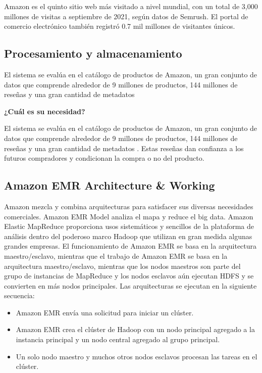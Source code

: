 Amazon es el quinto sitio web más visitado a nivel mundial, con un total de 3,000 millones de visitas a septiembre de 2021, según datos de Semrush. El portal de comercio electrónico también registró 0.7 mil millones de visitantes únicos. 

\subsection{Procesamiento y almacenamiento}
El sistema se evalúa en el catálogo de productos de Amazon, un gran conjunto de datos que comprende alrededor de 9 millones de productos, 144 millones de reseñas y una gran cantidad de metadatos 

\textbf{¿Cuál es su necesidad?}


El sistema se evalúa en el catálogo de productos de Amazon, un gran conjunto de datos que comprende alrededor de 9 millones de productos, 144 millones de reseñas y una gran cantidad de metadatos . Estas reseñas dan confianza a los futuros compradores y condicionan la compra   o no del producto.



\subsection{Amazon EMR Architecture \& Working}
Amazon mezcla y combina arquitecturas para satisfacer sus diversas necesidades comerciales. Amazon EMR Model analiza el mapa y reduce el big data. Amazon Elastic MapReduce proporciona usos sistemáticos y sencillos de la plataforma de análisis dentro del poderoso marco Hadoop que utilizan en gran medida algunas grandes empresas. El funcionamiento de Amazon EMR se basa en la arquitectura maestro/esclavo, mientras que el trabajo de Amazon EMR se basa en la arquitectura maestro/esclavo, mientras que los nodos maestros son parte del grupo de instancias de MapReduce y los nodos esclavos aún ejecutan HDFS y se convierten en más nodos principales. Las arquitecturas se ejecutan en la siguiente secuencia:
\begin{itemize}
	\item Amazon EMR envía una solicitud para iniciar un clúster.
	\item Amazon EMR crea el clúster de Hadoop con un nodo principal agregado a la instancia principal y un nodo central agregado al grupo principal.
	\item Un solo nodo maestro y muchos otros nodos esclavos procesan las tareas en el clúster.
\end{itemize}



